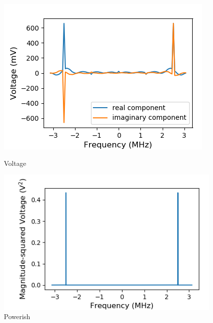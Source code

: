 \documentclass[a4paper]{article}
\begin{document}
\begin{figure}
\centering
\begin{minipage}{.5\textwidth}
	\centering
	\includegraphics[width=.8\linewidth]{5-3/volt1}
	\caption{Voltage}
	\label{fig:Volt1}
\end{minipage}%
\begin{minipage}{.5\textwidth}
	\centering
	\includegraphics[width=.8\linewidth]{5-3/pow1}
	\caption{Powerish}
	\label{fig:SyPw1}
\end{minipage}
\end{figure}
\end{document}
